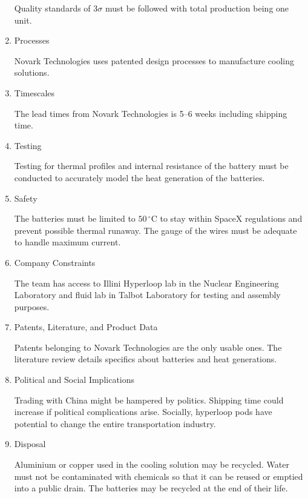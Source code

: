 \documentclass[11pt]{article}
\numberwithin{equation}{subsection} %
\newcommand{\unit}[1]{\ensuremath{\, \mathrm{#1}}}             %
\newcommand{\degree}{^\circ}                                   %
\begin{document}
\begin{enumerate}
       Quality standards of $3\sigma$ must be followed with total production being one unit.
        
        
    \item Processes
        
        Novark Technologies uses patented design processes to manufacture cooling solutions.
        
        
    \item Timescales
        
        The lead times from Novark Technologies is 5--6 weeks including shipping time.
        
        
    \item Testing
        
        Testing for thermal profiles and internal resistance of the battery must be conducted to accurately model the heat generation of the batteries.
        
        
    \item Safety
        
        The batteries must be limited to $50\unit{\degree C}$ to stay within SpaceX regulations and prevent possible thermal runaway. The gauge of the wires must be adequate to handle maximum current.
        
        
    \item Company Constraints
        
        The team has access to Illini Hyperloop lab in the Nuclear Engineering Laboratory and fluid lab in Talbot Laboratory for testing and assembly purposes. 
        
        
    \item Patents, Literature, and Product Data
        
        Patents belonging to Novark Technologies are the only usable ones. The literature review details specifics about batteries and heat generations.
        
        
    \item Political and Social Implications
        
        Trading with China might be hampered by politics. Shipping time could increase if political complications arise. Socially, hyperloop pods have potential to change the entire transportation industry. 
        
        
    \item Disposal
        
        Aluminium or copper used in the cooling solution may be recycled. Water must not be contaminated with chemicals so that it can be reused or emptied into a public drain. The batteries may be recycled at the end of their life.
           
           
\end{enumerate}
\end{document}
